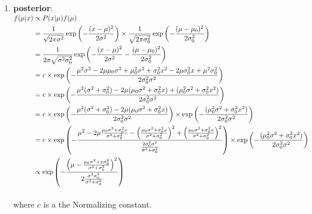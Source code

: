 \begin{enumerate}
    \item \textbf{posterior}:
    \hfill \cite{statistics/book/Statistics-for-Data-Scientists/Maurits-Kaptein}
    \\[0.2cm]
    $
        \begin{aligned}
            f (\mu|x) 
            &\propto P(x|\mu) f (\mu) \\
            &= \dfrac{1 }{\sqrt{2\pi\sigma^2} } \exp\left(- \dfrac{(x - \mu)^2}{2\sigma^2}\right) 
                \times \dfrac{1 }{\sqrt{2\pi\sigma^2 _0}} \exp \left(- \dfrac{(\mu - \mu_0)^2} {2\sigma^2_ 0} \right) \\
            &= \dfrac{1 }{2\pi \sqrt{\sigma^2\sigma^2_ 0}} 
                \exp \left(- \dfrac{(x - \mu)^2 }{2\sigma^2} - \dfrac{(\mu - \mu_0)^2 }{2\sigma^2_ 0} \right) \\
            &=c \times \exp \left(-\dfrac{ \mu^2\sigma^2 - 2\mu\mu_0\sigma^2 + \mu^2 _0\sigma^2 
                + \sigma^2_ 0 x^2 - 2\mu\sigma^2_ 0 x + \mu^2\sigma^2 _0}{2\sigma^2_0 \sigma^2}\right) \\
            &= c \times \exp \left(-\dfrac{\mu^2(\sigma^2 + \sigma^2 _0 ) - 2\mu(\mu_0\sigma^2 
                + \sigma^2_ 0 x) + (\mu^2_ 0\sigma^2 + \sigma^2_ 0 x^2)}{2\sigma^2_0 \sigma^2}\right) \\
            &= c \times \exp \left(-\dfrac{\mu^2(\sigma^2 + \sigma^2 _0 ) - 2\mu(\mu_0\sigma^2 
                + \sigma^2_ 0 x)}{2\sigma^2_0 \sigma^2}\right) 
                \times \exp \left(-\dfrac{(\mu^2_ 0\sigma^2 + \sigma^2_ 0 x^2)}{2\sigma^2_0 \sigma^2}\right) \\
            &= c \times \exp 
                \left(
                    -\dfrac{
                        \mu^2 - 2\mu\tfrac{\mu_0\sigma^2 + \sigma^2_ 0 x}{\sigma^2 + \sigma^2 _0} - \left(\tfrac{ \mu_0 \sigma^2 +\sigma^2_0 x}{\sigma^2 +\sigma^2_0}\right)^2 + \left(\tfrac{ \mu_0 \sigma^2 +\sigma^2_0 x}{\sigma^2 +\sigma^2_0}\right)^2
                    }
                    {\tfrac{2\sigma^2_0 \sigma^2}{\sigma^2 + \sigma^2 _0}}
                \right)
                \times \exp \left(-\dfrac{(\mu^2_ 0\sigma^2 + \sigma^2_ 0 x^2)}{2\sigma^2_0 \sigma^2}\right) \\
            &\propto \exp\left(-\dfrac{\left(\mu - \tfrac{\mu_0 \sigma^2 +x\sigma^2_0}
                {\sigma^2 +\sigma^2_0}\right)^2}{2\tfrac{\sigma^2 \sigma^2_0}{\sigma^2 +\sigma^2_0}}\right)
        \end{aligned}
    $
    \hfill \cite{statistics/book/Statistics-for-Data-Scientists/Maurits-Kaptein}
    \\[0.2cm]
    where $c$ is a the Normalizing constant.
    \hfill \cite{statistics/book/Statistics-for-Data-Scientists/Maurits-Kaptein}


\end{enumerate}
